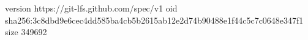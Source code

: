 version https://git-lfs.github.com/spec/v1
oid sha256:3c8dbd9e6cec4dd585ba4cb5b2615ab12e2d74b90488e1f44c5c7c0648e347f1
size 349692
